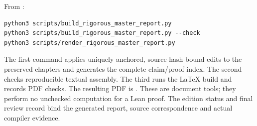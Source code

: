 From :
\begin{verbatim}
python3 scripts/build_rigorous_master_report.py
python3 scripts/build_rigorous_master_report.py --check
python3 scripts/render_rigorous_master_report.py
\end{verbatim}
The first command applies uniquely anchored, source-hash-bound edits to the preserved chapters and generates the complete claim/proof index. The second checks reproducible textual assembly. The third runs the LaTeX build and records PDF checks. The resulting PDF is . These are document tools; they perform no unchecked computation for a Lean proof. The edition status and final review record bind the generated report, source correspondence and actual compiler evidence.

